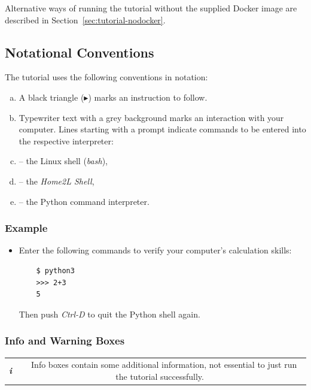 \documentclass[12pt,english,parskip=half,headheight=19pt]{scrreprt}
\renewenvironment{description}[1][8ex]
  {\list{}{\labelwidth=5ex \leftmargin=#1 \let\makelabel\descriptionlabel}}
  {\endlist}
\newcommand{\lst}[1]{\colorbox{lstbackground}{\footnotesize\code{#1}}}
\newcommand{\lstf}[1]{\colorbox{lstbackground}{\ttfamily\footnotesize#1}}
\newcommand{\infobox}[1]{
  \par
  \medskip
  \hfill
  \setlength\arrayrulewidth{1pt}
  \begin{tabular}[t]{c|c|}
    \parbox{1.8em}{\hfill\textit{\Huge\textbf{i}\,}}
    &
    \,\parbox{0.89\linewidth}{\setlength{\parskip}{0.5em} \small #1}\,
  \end{tabular}
  \medskip
  \par
}
\begin{document}
Alternative ways of running the tutorial without the supplied Docker image are described in Section~\ref{sec:tutorial-nodocker}.



\subsection{Notational Conventions}

The tutorial uses the following conventions in notation:

\begin{enumerate}[a)]
  \item A black triangle ($\blacktriangleright$) marks an instruction to follow.
  \item \lstf{Typewriter text with a grey background} marks an interaction with your computer.
    Lines starting with a prompt indicate commands to be entered into the respective
    interpreter:
    \begin{description}
      \item[\lstf{\$}] -- the Linux shell (\textit{bash}),
      \item[\lst{home2l>}] -- the \textit{Home2L Shell},
      \item[\lst{>>>}] -- the Python command interpreter.
    \end{description}
\end{enumerate}


\subsubsection*{Example}

\begin{itemize}[$\blacktriangleright$]
  \item Enter the following commands to verify your computer's calculation skills:
    \begin{lstlisting}
    $ python3
    >>> 2+3
    5
    \end{lstlisting}
    Then push \textit{Ctrl-D} to quit the Python shell again.
\end{itemize}


\subsubsection*{Info and Warning Boxes}

\infobox{
  Info boxes contain some additional information, not essential to just run the tutorial successfully.
}
\end{document}
